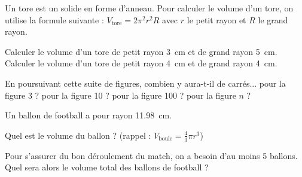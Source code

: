 \documentclass[../Cours.tex]{subfiles}
\begin{document}
\clearpage
\thispagestyle{empty}

\setcounter{DS}{2}

\color{black}
\nomPrenom{}
\titreDS

\begin{questions}
    Un tore est un solide en forme d'anneau. Pour calculer le volume d'un tore, on utilise la formule suivante : $V_{\mbox{tore}} = 2\pi^2r^2R$ avec $r$ le petit rayon et $R$ le grand rayon.

    \question Calculer le volume d'un tore de petit rayon \qty{3}{\centi\metre} et de grand rayon \qty{5}{\centi\metre}.
    \question Calculer le volume d'un tore de petit rayon \qty{4}{\centi\metre} et de grand rayon \qty{4}{\centi\metre}.

    \begin{center}
    \end{center}

    En poursuivant cette suite de figures, combien y aura-t-il de carrés...
    \question pour la figure 3 ?
    \question pour la figure 10 ?
    \question pour la figure 100 ?
    \question pour la figure $n$ ?

    Un ballon de football a pour rayon \qty{11.98}{\centi\metre}. 

    \question Quel est le volume du ballon ? (rappel : $V_{\mbox{boule}} = \frac{4}{3} \pi r^3$)
    
    \question Pour s'assurer du bon déroulement du match, on a besoin d'au moins 5 ballons. Quel sera alors le volume total des ballons de football ?


    \begin{center}
    \end{center}


\end{questions}
\end{document}
